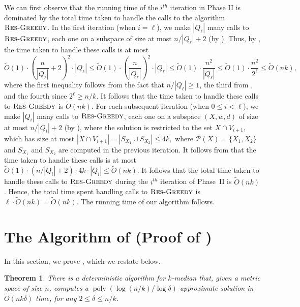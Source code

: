 \documentclass[11pt]{article}
\newcommand{\1}{\mathmybb{1}}
\newtheorem{theorem}{Theorem}[section]
\DeclareMathOperator*{\poly}{poly}
\newcommand{\Restr}{\textnormal{\textsc{Res-Greedy}}}
\newcommand{\calP}[0]{\mathcal{P}}
\begin{document}
We can first observe that the running time of the $i^{th}$ iteration in Phase II is dominated by the total time taken to handle the calls to the algorithm $\Restr$.
In the first iteration (when $i = \ell$), we make $|Q_\ell|$ many calls to $\Restr$, each one on a subspace of size at most $n/|Q_\ell| + 2$ (by ). Thus, by , the time taken to handle these calls is at most
\begin{equation*}
\tilde O(1) \cdot \left(\frac{n}{|Q_\ell|} + 2\right)^2 \cdot |Q_\ell| 
\leq \tilde O(1) \cdot  \left(\frac{n}{|Q_\ell|}\right)^2 \cdot |Q_\ell| 
\leq \tilde O(1) \cdot  \frac{n^2}{|Q_\ell|} 
\leq \tilde O(1) \cdot \frac{n^2}{2^\ell} 
\leq \tilde O(nk),
\end{equation*}
where the first inequality follows from the fact that $n/|Q_\ell| \geq 1$, the third from , and the fourth since $2^\ell \geq n/k$.
It follows that the time taken to handle these calls to $\Restr$ is $\tilde O(nk)$.
For each subsequent iteration (when $0 \leq i < \ell$), we make $|Q_i|$ many calls to $\Restr$,
each one on a subspace $(X,w,d)$ of size at most $n/|Q_i| + 2$ (by ), where the solution is restricted to the set $X \cap V_{i+1}$, which has size at most
$ |X \cap V_{i+1}| = |S_{X_1} \cup S_{X_2}| \leq 4k, $
where $\calP(X) = \{X_1, X_2\}$ and $S_{X_1}$ and $S_{X_2}$ are computed in the previous iteration.
It follows from  that the time taken to handle these calls is at most
$ \tilde O(1) \cdot (n/|Q_i| + 2) \cdot 4k \cdot |Q_i| \leq \tilde O(nk)$.
It follows that the total time taken to handle these calls to $\Restr$ during the $i^{th}$ iteration of Phase~II is $\tilde O(nk)$.
Hence, the total time spent handling calls to $\Restr$ is $\ell \cdot \tilde O(nk) = \tilde O(nk)$. The running time of our algorithm follows.
 




\newpage

\appendix

\section{The Algorithm of \cite{focs/GuhaMMO00} (Proof of )}\label{sec:guha alg}

In this section, we prove , which we restate below.

\begin{theorem}\label{thm:main:time:restate}
    There is a deterministic algorithm for $k$-median that, given a metric space of size $n$, computes a $\poly(\log(n/k) / \log \delta)$-approximate solution in $\tilde O(nk\delta)$ time, for any $2 \leq \delta \leq n/k$.
\end{theorem}
\end{document}

